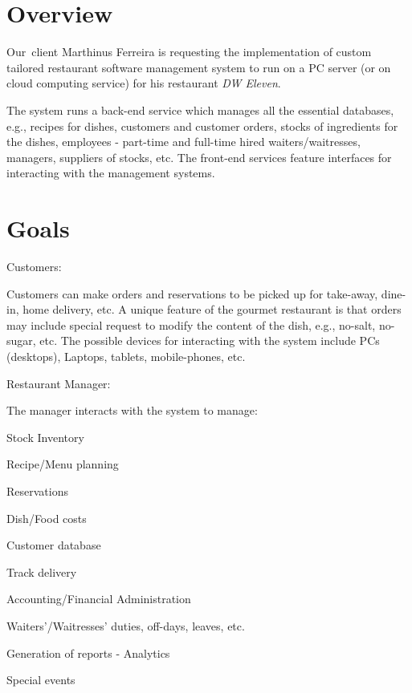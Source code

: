 \documentclass[a4paper,12pt]{report}
\begin{document}
\section*{Overview}
 \par
\noindent 
Our~client  Marthinus Ferreira is requesting the implementation of custom tailored restaurant software management system to run on a PC server (or on cloud computing service) for his restaurant \textit{DW Eleven}.  \par
\noindent 
The system runs a back-end service which manages all the essential databases, e.g., recipes for dishes, customers and customer orders, stocks of ingredients for the dishes, employees - part-time and full-time hired waiters/waitresses, managers, suppliers of stocks, etc. The front-end services feature interfaces for interacting with the management systems. \par
\noindent 
\section*{Goals}
 \par
\noindent 
Customers: \par
\noindent 
Customers can make orders and reservations to be picked up for take-away, dine-in, home delivery, etc. A unique feature of the gourmet restaurant is that orders may include special request to modify the content of the dish, e.g., no-salt, no-sugar, etc. The possible devices for interacting with the system include PCs (desktops), Laptops, tablets, mobile-phones, etc.  \par
\noindent 
Restaurant Manager:  \par
\noindent 
The manager interacts with the system to manage:  \par
\begin{myEnumerate}
\item Stock Inventory \par
\item Recipe/Menu planning \par
\item Reservations \par
\item Dish/Food costs \par
\item Customer database  \par
\item Track delivery \par
\item Accounting/Financial Administration \par
\item Waiters’/Waitresses’ duties, off-days, leaves, etc. \par
\item Generation of reports - Analytics \par
\item Special events \end{myEnumerate}
 \par
\vspace{12pt}
\vspace{12pt}
\noindent 
\end{document}
